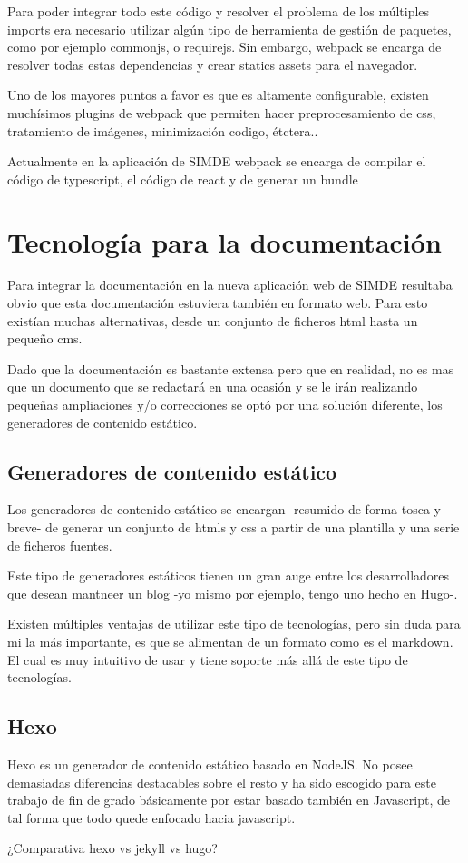 \bigskip
Para poder integrar todo este código y resolver el problema de los múltiples imports 
era necesario utilizar algún tipo de herramienta de gestión de paquetes, como por ejemplo 
commonjs, o requirejs. Sin embargo, webpack se encarga de resolver todas estas 
dependencias y crear statics assets para el navegador.

\bigskip
Uno de los mayores puntos a favor es que es altamente configurable, existen muchísimos 
plugins de webpack que permiten hacer preprocesamiento de css, tratamiento de imágenes,
minimización codigo, étctera.. 

\bigskip
Actualmente en la aplicación de SIMDE webpack  se encarga de compilar el código de 
typescript, el código de react y de generar un bundle 

\section{Tecnología para la documentación}
\label{3:sec4}

Para integrar la documentación en la nueva aplicación web de SIMDE resultaba obvio que esta documentación
estuviera también en formato web. Para esto existían muchas alternativas, desde un conjunto de ficheros
html hasta un pequeño cms. 

Dado que la documentación es bastante extensa pero que en realidad, no es mas que un documento 
que se redactará en una ocasión y se le irán realizando pequeñas ampliaciones y/o correcciones
se optó por una solución diferente, los generadores de contenido estático.

\subsection{Generadores de contenido estático}

Los generadores de contenido estático se encargan -resumido de forma tosca y breve- de generar 
un conjunto de htmls y css a partir de una plantilla y una serie de ficheros fuentes. 

\bigskip
Este tipo de generadores estáticos tienen un gran auge entre los desarrolladores que desean 
mantneer un blog -yo mismo por ejemplo, tengo uno hecho en Hugo-. 

\bigskip 
Existen múltiples ventajas de utilizar este tipo de tecnologías, pero sin duda para mi la más
importante, es que se alimentan de un formato como es el markdown. El cual es muy intuitivo de 
usar y tiene soporte más allá de este tipo de tecnologías. 

\subsection{Hexo}

Hexo es un generador de contenido estático basado en NodeJS. No posee demasiadas diferencias destacables
sobre el resto y ha sido escogido para este trabajo de fin de grado básicamente por estar basado 
también en Javascript, de tal forma que todo quede enfocado hacia javascript.

\bigskip
¿Comparativa hexo vs jekyll vs hugo?

